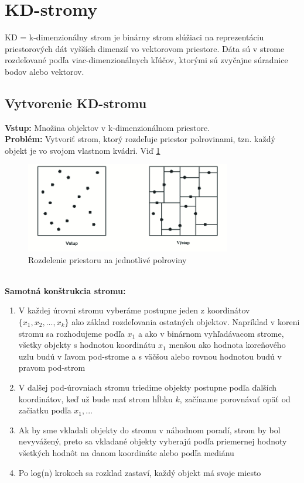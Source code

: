 \documentclass[12pt,a4paper,oneside]{fithesis2}
\begin{document}
\section{KD-stromy}
KD = k-dimenzionálny strom \cite{Kibriya2007} je binárny strom slúžiaci na reprezentáciu priestorových dát vyšších dimenzií vo vektorovom priestore. Dáta sú v strome rozdeľované podľa viac-dimenzionálnych kľúčov, ktorými sú zvyčajne súradnice bodov alebo vektorov. 
\subsection{Vytvorenie KD-stromu}
\textbf{Vstup:} Množina objektov v k-dimenzionálnom priestore. \\
\textbf{Problém:} Vytvoriť strom, ktorý rozdeľuje priestor polrovinami, tzn. každý objekt je vo svojom vlastnom kvádri. Viď \ref{fig:polroviny}\\
\begin{figure}[h]
  		\centering
  		\includegraphics[width=9cm]{obr/lp2.png}
  		\caption{Rozdelenie priestoru na jednotlivé polroviny}
  		\label{fig:polroviny}
\end{figure}\\
\textbf{Samotná konštrukcia stromu:}
\begin{enumerate}
\item V každej úrovni stromu vyberáme postupne jeden z koordinátov $ \{ x_1,x_2,...,x_k \} $ ako základ rozdeľovania ostatných objektov. Napríklad v koreni stromu sa rozhodujeme podľa $x_1$ a ako v binárnom vyhľadávacom strome, všetky objekty s hodnotou koordinátu $x_1$ menšou ako hodnota koreňového uzlu budú v ľavom pod-strome a s väčšou alebo rovnou hodnotou budú v pravom pod-strom
\item V ďalšej pod-úrovniach stromu triedime objekty postupne podľa ďalších koordinátov, keď už bude mať strom hĺbku $k$, začíname porovnávať opäť od začiatku podľa $x_1,...$
\item Ak by sme vkladali objekty do stromu v náhodnom poradí, strom by bol nevyvážený, preto sa vkladané objekty vyberajú podľa priemernej hodnoty všetkých hodnôt na danom koordináte alebo podľa mediánu
\item Po log(n) krokoch sa rozklad zastaví, každý objekt má svoje miesto
\end{enumerate} 
\end{document}
